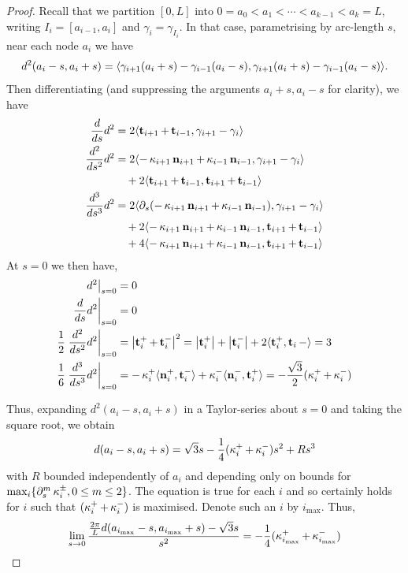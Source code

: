 \documentclass[11pt]{amsart}
\begin{document}
\begin{proof}
Recall that we partition \([0, L]\) into \(0 = a_0 < a_1 < \cdots < a_{k-1} < a_k = L\), writing \(I_i = [a_{i-1}, a_i]\) and \(\gamma_i = \gamma_{I_i}\). In that case, parametrising by arc-length $s$, near each node $a_i$ we have
\[
d^2(a_i - s, a_i + s) = \langle{\gamma_{i+1}(a_i + s) - \gamma_{i-1}(a_i - s)},{\gamma_{i+1}(a_i + s) - \gamma_{i-1}(a_i - s)}\rangle.
\]
Then differentiating (and suppressing the arguments \(a_i + s, a_i - s\) for clarity), we have
\begin{align*}
\frac{d}{ds} d^2 &= 2 \langle{\operatorname{\mathbf{t}}_{i+1} + \operatorname{\mathbf{t}}_{i-1}},{\gamma_{i+1} - \gamma_i}\rangle \\
\frac{d^2}{ds^2} d^2 &= 2 \langle{-\operatorname{\kappa}_{i+1} \operatorname{\mathbf{n}}_{i+1} + \operatorname{\kappa}_{i-1} \operatorname{\mathbf{n}}_{i-1}},{\gamma_{i+1} - \gamma_i}\rangle \\
&\quad + 2 \langle{\operatorname{\mathbf{t}}_{i+1} + \operatorname{\mathbf{t}}_{i-1}},{\operatorname{\mathbf{t}}_{i+1} + \operatorname{\mathbf{t}}_{i-1}}\rangle \\
\frac{d^3}{ds^3} d^2 &= 2 \langle{\partial_s(-\operatorname{\kappa}_{i+1} \operatorname{\mathbf{n}}_{i+1}  + \operatorname{\kappa}_{i-1} \operatorname{\mathbf{n}}_{i-1} )},{\gamma_{i+1}  - \gamma_i}\rangle \\
&\quad + 2 \langle{-\operatorname{\kappa}_{i+1} \operatorname{\mathbf{n}}_{i+1}  + \operatorname{\kappa}_{i-1} \operatorname{\mathbf{n}}_{i-1} },{\operatorname{\mathbf{t}}_{i+1} + \operatorname{\mathbf{t}}_{i-1}}\rangle \\
&\quad + 4 \langle{-\operatorname{\kappa}_{i+1} \operatorname{\mathbf{n}}_{i+1}  + \operatorname{\kappa}_{i-1} \operatorname{\mathbf{n}}_{i-1} },{\operatorname{\mathbf{t}}_{i+1} + \operatorname{\mathbf{t}}_{i-1}}\rangle
\end{align*}
At \(s = 0\) we then have,
\begin{align*}
\left. d^2 \right|_{s=0} &= 0 \\
\left.\frac{d}{ds} d^2\right|_{s=0} &= 0 \\
\frac{1}{2} \left.\frac{d^2}{ds^2} d^2 \right|_{s=0} &= \left|\operatorname{\mathbf{t}}_i^+ + \operatorname{\mathbf{t}}_i^-\right|^2 = \left|\operatorname{\mathbf{t}}_i^+\right| + \left|\operatorname{\mathbf{t}}_i^-\right| + 2\langle{\operatorname{\mathbf{t}}_i^+},{\operatorname{\mathbf{t}}_i-}\rangle = 3 \\
\frac{1}{6} \left.\frac{d^3}{ds^3} d^2 \right|_{s=0} &= -\operatorname{\kappa}_i^+ \langle{\operatorname{\mathbf{n}}_i^+},{\operatorname{\mathbf{t}}_i^-}\rangle + \operatorname{\kappa}_i^- \langle{\operatorname{\mathbf{n}}_i^-},{\operatorname{\mathbf{t}}_i^+}\rangle = -\frac{\sqrt{3}}{2} (\operatorname{\kappa}_i^+ + \operatorname{\kappa}_i^-) \\
\end{align*}

Thus, expanding \(d^2(a_i - s, a_i + s)\) in a Taylor-series about \(s = 0\) and taking the square root, we obtain
\[
d(a_i - s, a_i + s) = \sqrt{3} s - \frac{1}{4} (\operatorname{\kappa}^+_i + \operatorname{\kappa}^-_i) s^2 + R s^3
\]
with \(R\) bounded independently of \(a_i\) and depending only on bounds for \(\max_i \{\partial^{m}_s \operatorname{\kappa}_i^{\pm}, 0 \leq m \leq 2\}\). The equation is true for each \(i\) and so certainly holds for \(i\) such that \((\operatorname{\kappa}^+_i + \operatorname{\kappa}^-_i)\) is maximised. Denote such an \(i\) by \(i_{\max}\). Thus,
\[
\lim_{s\to 0} \frac{\tfrac{2\pi}{L} d(a_{i_{\max}} - s, a_{i_{\max}} + s) - \sqrt{3} s}{s^2} = - \frac{1}{4} (\operatorname{\kappa}^+_{i_{\max}} + \operatorname{\kappa}^-_{i_{\max}})
\]


\end{proof}
\end{document}
